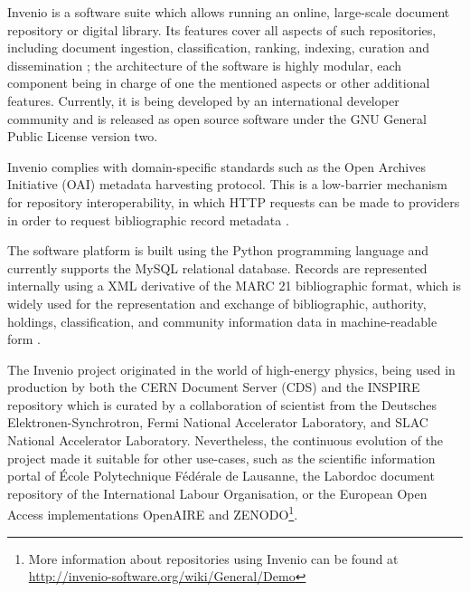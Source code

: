 
Invenio \cite{ref:invenio} is a software suite which allows running an online,
large-scale document repository or digital library. Its features cover all
aspects of such repositories, including document ingestion, classification,
ranking, indexing, curation and dissemination \cite{ref:kaplun, ref:glauner};
the architecture of the software is highly modular, each component being in
charge of one the mentioned aspects or other additional features. Currently, it
is being developed by an international developer community and is released as
open source software under the GNU General Public License version two.

Invenio complies with domain-specific standards such as the Open Archives
Initiative (OAI) metadata harvesting protocol. This is a low-barrier mechanism for
repository interoperability, in which HTTP requests can be made to providers in
order to request bibliographic record metadata \cite{ref:oai}.

The software platform is built using the Python programming language and
currently supports the MySQL relational database. Records are represented
internally using a XML derivative of the MARC 21 bibliographic format, which is
widely used for the representation and exchange of bibliographic, authority,
holdings, classification, and community information data in machine-readable
form \cite{ref:marc}.

The Invenio project originated in the world of high-energy physics, being used
in production by both the CERN Document Server (CDS) and the INSPIRE repository
which is curated by a collaboration of scientist from the Deutsches
Elektronen-Synchrotron, Fermi National Accelerator Laboratory, and SLAC
National Accelerator Laboratory. Nevertheless, the continuous evolution of the
project made it suitable for other use-cases, such as the scientific
information portal of \'{E}cole Polytechnique F\'{e}d\'{e}rale de Lausanne, the
Labordoc document repository of the International Labour Organisation, or the
European Open Access implementations OpenAIRE and ZENODO\footnote{More
information about repositories using Invenio can be found at
\url{http://invenio-software.org/wiki/General/Demo}}.
